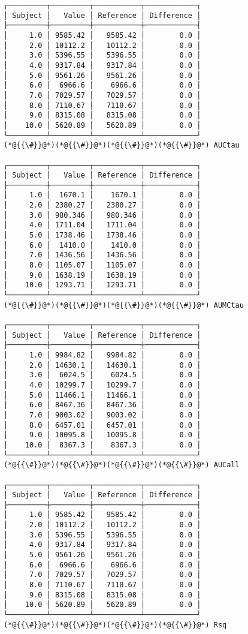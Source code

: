 \documentclass[12pt,a4paper]{article}
\begin{document}
\begin{lstlisting}
┌─────────┬─────────┬───────────┬────────────┐
│ Subject │   Value │ Reference │ Difference │
├─────────┼─────────┼───────────┼────────────┤
│     1.0 │ 9585.42 │   9585.42 │        0.0 │
│     2.0 │ 10112.2 │   10112.2 │        0.0 │
│     3.0 │ 5396.55 │   5396.55 │        0.0 │
│     4.0 │ 9317.84 │   9317.84 │        0.0 │
│     5.0 │ 9561.26 │   9561.26 │        0.0 │
│     6.0 │  6966.6 │    6966.6 │        0.0 │
│     7.0 │ 7029.57 │   7029.57 │        0.0 │
│     8.0 │ 7110.67 │   7110.67 │        0.0 │
│     9.0 │ 8315.08 │   8315.08 │        0.0 │
│    10.0 │ 5620.89 │   5620.89 │        0.0 │
└─────────┴─────────┴───────────┴────────────┘
(*@{{\#}}@*)(*@{{\#}}@*)(*@{{\#}}@*)(*@{{\#}}@*) AUCtau

┌─────────┬─────────┬───────────┬────────────┐
│ Subject │   Value │ Reference │ Difference │
├─────────┼─────────┼───────────┼────────────┤
│     1.0 │  1670.1 │    1670.1 │        0.0 │
│     2.0 │ 2380.27 │   2380.27 │        0.0 │
│     3.0 │ 980.346 │   980.346 │        0.0 │
│     4.0 │ 1711.04 │   1711.04 │        0.0 │
│     5.0 │ 1738.46 │   1738.46 │        0.0 │
│     6.0 │  1410.0 │    1410.0 │        0.0 │
│     7.0 │ 1436.56 │   1436.56 │        0.0 │
│     8.0 │ 1105.07 │   1105.07 │        0.0 │
│     9.0 │ 1638.19 │   1638.19 │        0.0 │
│    10.0 │ 1293.71 │   1293.71 │        0.0 │
└─────────┴─────────┴───────────┴────────────┘
(*@{{\#}}@*)(*@{{\#}}@*)(*@{{\#}}@*)(*@{{\#}}@*) AUMCtau

┌─────────┬─────────┬───────────┬────────────┐
│ Subject │   Value │ Reference │ Difference │
├─────────┼─────────┼───────────┼────────────┤
│     1.0 │ 9984.82 │   9984.82 │        0.0 │
│     2.0 │ 14630.1 │   14630.1 │        0.0 │
│     3.0 │  6024.5 │    6024.5 │        0.0 │
│     4.0 │ 10299.7 │   10299.7 │        0.0 │
│     5.0 │ 11466.1 │   11466.1 │        0.0 │
│     6.0 │ 8467.36 │   8467.36 │        0.0 │
│     7.0 │ 9003.02 │   9003.02 │        0.0 │
│     8.0 │ 6457.01 │   6457.01 │        0.0 │
│     9.0 │ 10095.8 │   10095.8 │        0.0 │
│    10.0 │  8367.3 │    8367.3 │        0.0 │
└─────────┴─────────┴───────────┴────────────┘
(*@{{\#}}@*)(*@{{\#}}@*)(*@{{\#}}@*)(*@{{\#}}@*) AUCall

┌─────────┬─────────┬───────────┬────────────┐
│ Subject │   Value │ Reference │ Difference │
├─────────┼─────────┼───────────┼────────────┤
│     1.0 │ 9585.42 │   9585.42 │        0.0 │
│     2.0 │ 10112.2 │   10112.2 │        0.0 │
│     3.0 │ 5396.55 │   5396.55 │        0.0 │
│     4.0 │ 9317.84 │   9317.84 │        0.0 │
│     5.0 │ 9561.26 │   9561.26 │        0.0 │
│     6.0 │  6966.6 │    6966.6 │        0.0 │
│     7.0 │ 7029.57 │   7029.57 │        0.0 │
│     8.0 │ 7110.67 │   7110.67 │        0.0 │
│     9.0 │ 8315.08 │   8315.08 │        0.0 │
│    10.0 │ 5620.89 │   5620.89 │        0.0 │
└─────────┴─────────┴───────────┴────────────┘
(*@{{\#}}@*)(*@{{\#}}@*)(*@{{\#}}@*)(*@{{\#}}@*) Rsq


\end{lstlisting}
\end{document}

